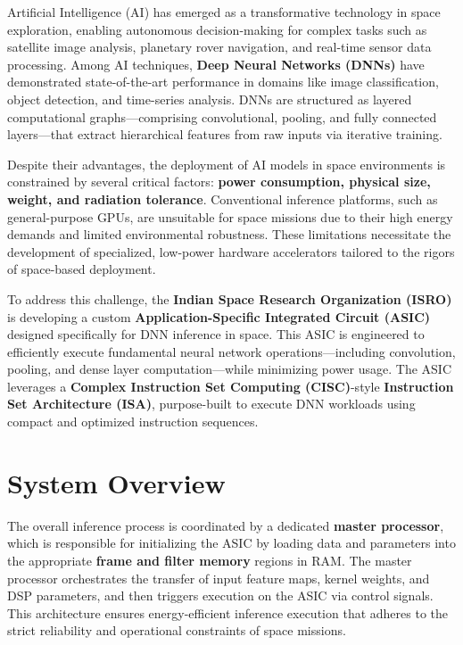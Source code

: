 \documentclass[12pt]{report}
\begin{document}
Artificial Intelligence (AI) has emerged as a transformative technology in space exploration, enabling autonomous decision-making for complex tasks such as satellite image analysis, planetary rover navigation, and real-time sensor data processing. Among AI techniques, \textbf{Deep Neural Networks (DNNs)} have demonstrated state-of-the-art performance in domains like image classification, object detection, and time-series analysis. DNNs are structured as layered computational graphs—comprising convolutional, pooling, and fully connected layers—that extract hierarchical features from raw inputs via iterative training.

Despite their advantages, the deployment of AI models in space environments is constrained by several critical factors: \textbf{power consumption, physical size, weight, and radiation tolerance}. Conventional inference platforms, such as general-purpose GPUs, are unsuitable for space missions due to their high energy demands and limited environmental robustness. These limitations necessitate the development of specialized, low-power hardware accelerators tailored to the rigors of space-based deployment.

To address this challenge, the \textbf{Indian Space Research Organization (ISRO)} is developing a custom \textbf{Application-Specific Integrated Circuit (ASIC)} designed specifically for DNN inference in space. This ASIC is engineered to efficiently execute fundamental neural network operations—including convolution, pooling, and dense layer computation—while minimizing power usage. The ASIC leverages a \textbf{Complex Instruction Set Computing (CISC)}-style \textbf{Instruction Set Architecture (ISA)}, purpose-built to execute DNN workloads using compact and optimized instruction sequences.

\section{System Overview}
The overall inference process is coordinated by a dedicated \textbf{master processor}, which is responsible for initializing the ASIC by loading data and parameters into the appropriate \textbf{frame and filter memory} regions in RAM. The master processor orchestrates the transfer of input feature maps, kernel weights, and DSP parameters, and then triggers execution on the ASIC via control signals. This architecture ensures energy-efficient inference execution that adheres to the strict reliability and operational constraints of space missions.
\end{document}
